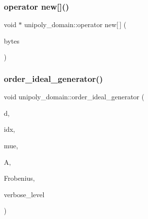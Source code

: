 \mbox{\label{classunipoly__domain_a386bac084ce39f22402bf8a5c2b90917}} 
\subsubsection{\texorpdfstring{operator new[]()}{operator new[]()}}
{\footnotesize\ttfamily void $\ast$ unipoly\+\_\+domain\+::operator new\mbox{[}$\,$\mbox{]} (\begin{DoxyParamCaption}\item[{size\+\_\+t}]{bytes }\end{DoxyParamCaption})}

\mbox{\label{classunipoly__domain_a2610dcbc95a611ad0108a5b1b679dacb}} 
\subsubsection{\texorpdfstring{order\+\_\+ideal\+\_\+generator()}{order\_ideal\_generator()}}
{\footnotesize\ttfamily void unipoly\+\_\+domain\+::order\+\_\+ideal\+\_\+generator (\begin{DoxyParamCaption}\item[{\mbox{\hyperlink{galois_8h_a09fddde158a3a20bd2dcadb609de11dc}{I\+NT}}}]{d,  }\item[{\mbox{\hyperlink{galois_8h_a09fddde158a3a20bd2dcadb609de11dc}{I\+NT}}}]{idx,  }\item[{\mbox{\hyperlink{galois_8h_a77ca58de3d2da6172242493dd9c8aaa8}{unipoly\+\_\+object}} \&}]{mue,  }\item[{\mbox{\hyperlink{galois_8h_a09fddde158a3a20bd2dcadb609de11dc}{I\+NT}} $\ast$}]{A,  }\item[{\mbox{\hyperlink{galois_8h_a09fddde158a3a20bd2dcadb609de11dc}{I\+NT}} $\ast$}]{Frobenius,  }\item[{\mbox{\hyperlink{galois_8h_a09fddde158a3a20bd2dcadb609de11dc}{I\+NT}}}]{verbose\+\_\+level }\end{DoxyParamCaption})}

\mbox{\label{classunipoly__domain_a8405795cc24002166e516b3aaaf5d1e5}} 
